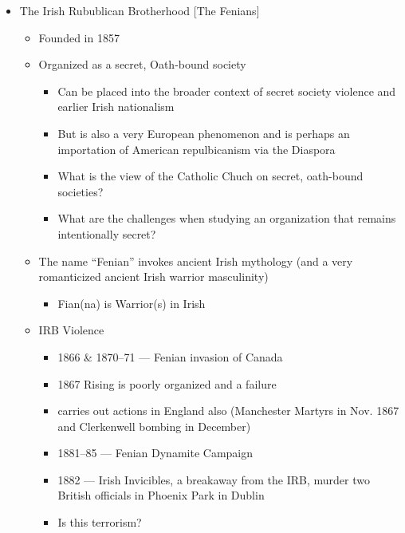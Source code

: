 \documentclass[12pt]{article}
\begin{document}
\begin{itemize}
\begin{itemize}
                \end{itemize}
                \item The Irish Rubublican Brotherhood [The Fenians]
                \begin{itemize}
                    \item Founded in 1857
                    \item Organized as a secret, Oath-bound society
                    \begin{itemize}
                        \item Can be placed into the broader context of secret society violence and earlier Irish nationalism
                        \item But is also a very European phenomenon and is perhaps an importation of American repulbicanism via the Diaspora
                        \item What is the view of the Catholic Chuch on secret, oath-bound societies?
                        \item What are the challenges when studying an organization that remains intentionally secret?
                    \end{itemize}
                    \item The name ``Fenian'' invokes ancient Irish mythology (and a very romanticized ancient Irish warrior masculinity)
                    \begin{itemize}
                        \item Fian(na) is Warrior(s) in Irish
                    \end{itemize}
                    \item IRB Violence
                    \begin{itemize}
                        \item 1866 \& 1870--71 --- Fenian invasion of Canada
                        \item 1867 Rising is poorly organized and a failure
                        \item carries out actions in England also (Manchester Martyrs in Nov. 1867 and Clerkenwell bombing in December)
                        \item 1881--85 --- Fenian Dynamite Campaign
                        \item 1882 --- Irish Invicibles, a breakaway from the IRB, murder two British officials in Phoenix Park in Dublin
                        \item Is this terrorism?

\end{itemize}
\end{itemize}
\end{itemize}
\end{document}
